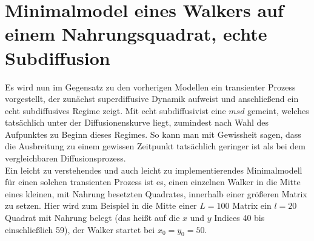\documentclass[a4paper, 12pt]{report}
\begin{document}
\section{Minimalmodel eines Walkers auf einem Nahrungsquadrat, echte Subdiffusion}\label{minimalmodell}
Es wird nun im Gegensatz zu den vorherigen Modellen ein transienter Prozess vorgestellt, der zunächst superdiffusive Dynamik aufweist und anschließend ein echt subdiffusives Regime zeigt. Mit echt subdiffusivist eine $msd$ gemeint, welches tatsächlich unter der Diffusionenskurve liegt, zumindest nach Wahl des Aufpunktes zu Beginn dieses Regimes. So kann man mit Gewissheit sagen, dass die Ausbreitung zu einem gewissen Zeitpunkt tatsächlich geringer ist als bei dem vergleichbaren Diffusionsprozess.
\\
Ein leicht zu verstehendes und auch leicht zu implementierendes Minimal\-modell für einen solchen transienten Prozess ist es, einen einzelnen Walker in die Mitte eines kleinen, mit Nahrung besetzten Quadrates, innerhalb einer größeren Matrix zu setzen. Hier wird zum Beispiel in die Mitte einer $L=100$ Matrix ein $l=20$ Quadrat mit Nahrung belegt (das heißt auf die $x$ und $y$ Indices 40 bis einschließlich 59), der Walker startet bei $x_0=y_0=50$.
\end{document}
